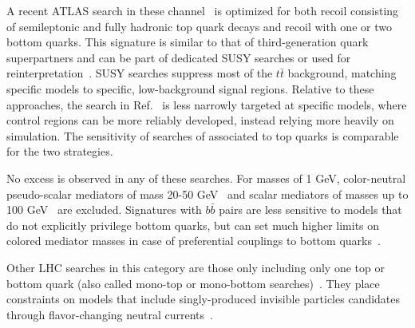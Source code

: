 A recent ATLAS search in these channel~\cite{Aaboud:2017rzf} is optimized for both recoil consisting of semileptonic and fully hadronic top quark decays and recoil with one or two bottom quarks.
This signature is similar to that of third-generation quark superpartners and can be part of dedicated SUSY searches or used for reinterpretation~\cite{Aaboud:2017aeu,Sirunyan:2017leh}.
SUSY searches suppress most of the $t\bar{t}$ background, matching specific models to specific, low-background signal regions. 
Relative to these approaches, the search in Ref.~\cite{Aaboud:2017rzf} is less narrowly targeted at specific models, where control regions can be more reliably developed, instead relying more heavily on simulation.
The sensitivity of searches of \MET associated to top quarks is comparable for the two strategies. 

No excess is observed in any of these searches. 
For \IP masses of 1 GeV, color-neutral pseudo-scalar mediators of mass 20-50 GeV~\cite{Aaboud:2017aeu} and scalar mediators of masses up to 100 GeV~\cite{Sirunyan:2017leh} are excluded. %
Signatures with $b\bar{b}$ pairs are less sensitive to models that do not explicitly privilege bottom quarks, but can set much higher limits on colored mediator masses in case of preferential couplings to bottom quarks~\cite{Agrawal:2014una}. 


Other LHC searches in this category are those only including only one top or bottom quark (also called mono-top or mono-bottom searches)~\cite{Sirunyan:2018gka, Aad:2014wza}.
They place constraints on models that include singly-produced invisible particles candidates through flavor-changing neutral currents~\cite{Boucheneb:2014wza}.


